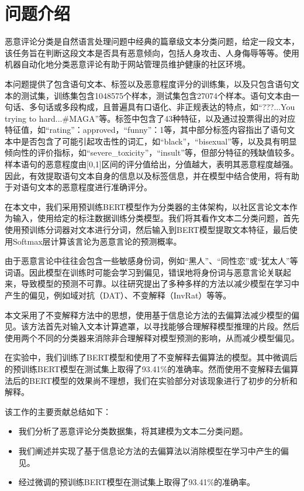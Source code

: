 \section{问题介绍} %

恶意评论分类是自然语言处理问题中经典的篇章级文本分类问题，给定一段文本，该任务旨在判断这段文本是否具有恶意倾向，包括人身攻击、人身侮辱等等。使用机器自动化地分类恶意评论有助于网站管理员维护健康的社区环境。

本问题提供了包含语句文本、标签以及恶意程度评分的训练集，以及只包含语句文本的测试集，训练集包含1048575个样本，测试集包含27074个样本。语句文本由一句话、多句话或多段构成，且普遍具有口语化、非正规表达的特点，如``???...You trying to hard...\#MAGA''等。标签中包含了43种特征，以及通过投票得出的对应特征值，如``rating''：approved，``funny''：1等，其中部分标签内容指出了语句文本中是否包含了可能引起攻击性的词汇，如``black''，``bisexual''等，以及具有明显倾向性的评价指标，如``severe\_toxicity''，``insult''等，但部分特征的残缺值较多。样本语句的恶意程度由[0,1]区间的评分值给出，分值越大，表明其恶意程度越强。因此，有效提取语句文本自身的信息以及标签信息，并在模型中结合使用，将有助于对语句文本的恶意程度进行准确评分。

在本文中，我们采用预训练BERT模型\cite{devlin2019bert}作为分类器的主体架构，以社区言论文本作为输入，使用给定的标注数据训练分类模型。我们将其看作文本二分类问题，首先使用预训练分词器对文本进行分词，然后输入到BERT模型提取文本特征，最后使用Softmax层计算该言论为恶意言论的预测概率。

由于恶意言论中往往会包含一些敏感身份词，例如``黑人''、``同性恋''或``犹太人''等词语。因此模型在训练时可能会学习到偏见，错误地将身份词与恶意言论关联起来，导致模型的预测不可靠。以往研究提出了多种多样的方法以减少模型在学习中产生的偏见，例如域对抗（DAT）\cite{ganin2016domain}、不变解释（InvRat）\cite{chang2020invariant}等等。

本文采用了不变解释方法\cite{chang2020invariant}中的思想，使用基于信息论方法的去偏算法减少模型的偏见。该方法首先对输入文本计算遮罩，以寻找能够合理解释模型推理的片段。然后使用两个不同的分类器来消除非合理解释对模型预测的影响，从而减少模型偏见。

在实验中，我们训练了BERT模型和使用了不变解释去偏算法的模型。其中微调后的预训练BERT模型在测试集上取得了93.41\%的准确率。然而使用不变解释去偏算法后的BERT模型的效果尚不理想，我们在实验部分对该现象进行了初步的分析和解释。

该工作的主要贡献总结如下：
\begin{itemize}
    \item 我们分析了恶意评论分类数据集，将其建模为文本二分类问题。
    \item 我们阐述并实现了基于信息论方法的去偏算法以消除模型在学习中产生的偏见。
    \item 经过微调的预训练BERT模型在测试集上取得了93.41\%的准确率。
\end{itemize}
